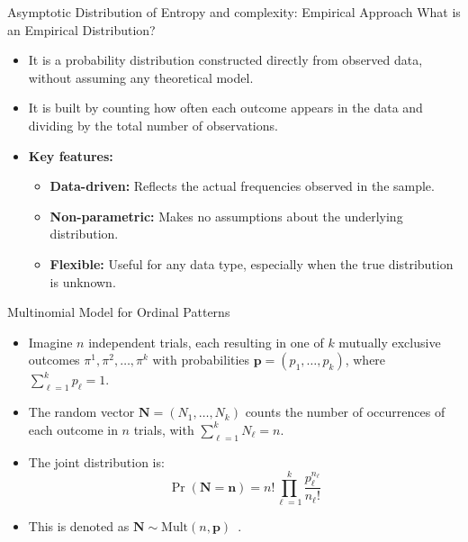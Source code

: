 \documentclass{beamer}
\begin{document}
\begin{frame}{Asymptotic Distribution of Entropy and complexity: Empirical Approach}
What is an \alert{Empirical Distribution}?
	\begin{itemize}
		\item It is a probability distribution constructed directly from observed data, without assuming any theoretical model.
		\item It is built by counting how often each outcome appears in the data and dividing by the total number of observations.
		\item \textbf{Key features:}
		\begin{itemize}
			\item \textbf{Data-driven:} Reflects the actual frequencies observed in the sample.
			\item \textbf{Non-parametric:} Makes no assumptions about the underlying distribution.
			\item \textbf{Flexible:} Useful for any data type, especially when the true distribution is unknown.
		\end{itemize}
	\end{itemize}
\end{frame}


\begin{frame}{Multinomial Model for Ordinal Patterns}
	\begin{itemize}
		\item Imagine $n$ independent trials, each resulting in one of $k$ mutually exclusive outcomes $\pi^1, \pi^2, \ldots, \pi^k$ with probabilities $\mathbf{p} = (p_1, \ldots, p_k)$, where $\sum_{\ell=1}^{k} p_\ell = 1$.
		\item The random vector $\mathbf{N} = (N_1, \ldots, N_k)$ counts the number of occurrences of each outcome in $n$ trials, with $\sum_{\ell=1}^{k} N_\ell = n$.
		\item The joint distribution is:
		\[
		\Pr(\mathbf{N} = \mathbf{n}) = n! \prod_{\ell=1}^{k} \frac{p_\ell^{n_\ell}}{n_\ell!}
		\]
		\item This is denoted as $\mathbf{N} \sim \text{Mult}(n, \mathbf{p})$~\cite{Rey2023}.
	\end{itemize}
\end{frame}
\end{document}
